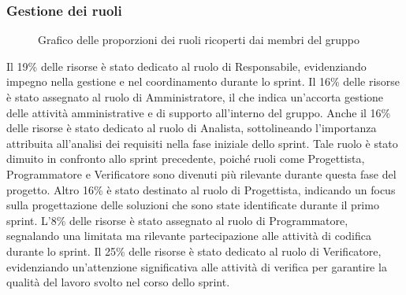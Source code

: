 \subsubsection{Gestione dei ruoli}

\begin{figure}[h]
	\centering
	\caption{Grafico delle proporzioni dei ruoli ricoperti dai membri del gruppo}
\end{figure}

Il 19\% delle risorse è stato dedicato al ruolo di Responsabile, evidenziando impegno nella gestione e nel coordinamento durante lo sprint.
Il 16\% delle risorse è stato assegnato al ruolo di Amministratore, il che indica un'accorta gestione delle attività amministrative 
e di supporto all'interno del gruppo.
Anche il 16\% delle risorse è stato dedicato al ruolo di Analista, sottolineando l'importanza attribuita all'analisi 
dei requisiti nella fase iniziale dello sprint. Tale ruolo è stato dimuito in confronto allo sprint precedente, poiché ruoli come Progettista, 
Programmatore e Verificatore sono divenuti più rilevante durante questa fase del progetto.
Altro 16\% è stato destinato al ruolo di Progettista, indicando un focus sulla progettazione delle soluzioni che sono state identificate durante il primo sprint.
L'8\% delle risorse è stato assegnato al ruolo di Programmatore, segnalando una limitata ma rilevante partecipazione alle 
attività di codifica durante lo sprint.
Il 25\% delle risorse è stato dedicato al ruolo di Verificatore, evidenziando un'attenzione significativa alle attività di 
verifica per garantire la qualità del lavoro svolto nel corso dello sprint.






